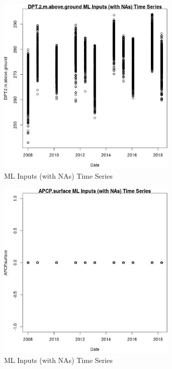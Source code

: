 \begin{figure} 
\centering  
\includegraphics[width=0.77\textwidth]{Code_Outputs/Report_ML_input_PM25_Step4_part_e_de_duplicated_aves_compiled_2019-05-18wNAs_DPT2mabovegroundvDate.jpg} 
\caption{\label{fig:Report_ML_input_PM25_Step4_part_e_de_duplicated_aves_compiled_2019-05-18wNAsDPT2mabovegroundvDate}ML Inputs (with NAs) Time Series} 
\end{figure} 
 

\begin{figure} 
\centering  
\includegraphics[width=0.77\textwidth]{Code_Outputs/Report_ML_input_PM25_Step4_part_e_de_duplicated_aves_compiled_2019-05-18wNAs_APCPsurfacevDate.jpg} 
\caption{\label{fig:Report_ML_input_PM25_Step4_part_e_de_duplicated_aves_compiled_2019-05-18wNAsAPCPsurfacevDate}ML Inputs (with NAs) Time Series} 
\end{figure} 
 

